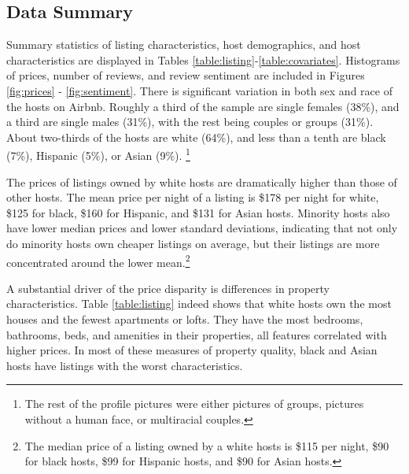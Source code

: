 \subsection{Data Summary}
	\label{summary}
Summary statistics of listing characteristics, host demographics, and host characteristics are displayed in Tables \ref{table:listing}-\ref{table:covariates}. Histograms of prices, number of reviews, and review sentiment are included in Figures \ref{fig:prices} - \ref{fig:sentiment}. There is significant variation in both sex and race of the hosts on Airbnb. Roughly a third of the sample are single females (38\%), and a third are single males (31\%), with the rest being couples or groups (31\%). About two-thirds of the hosts are white (64\%), and less than a tenth are black (7\%), Hispanic (5\%), or Asian (9\%).%
	\footnote{The rest of the profile pictures were either pictures of groups, pictures without a human face, or multiracial couples.} 

The prices of listings owned by white hosts are dramatically higher than those of other hosts. The mean price per night of a listing is \$178 per night for white, \$125 for black, \$160 for Hispanic, and \$131 for Asian hosts. Minority hosts also have lower median prices and lower standard deviations, indicating that not only do minority hosts own cheaper listings on average, but their listings are more concentrated around the lower mean.\footnote{The median price of a listing owned by a white hosts is \$115 per night, \$90 for black hosts, \$99 for Hispanic hosts, and \$90 for Asian hosts.} 

A substantial driver of the price disparity is differences in property characteristics. Table \ref{table:listing} indeed shows that white hosts own the most houses and the fewest apartments or lofts. They have the most bedrooms, bathrooms, beds, and amenities in their properties, all features correlated with higher prices. In most of these measures of property quality, black and Asian hosts have listings with the worst characteristics. 

